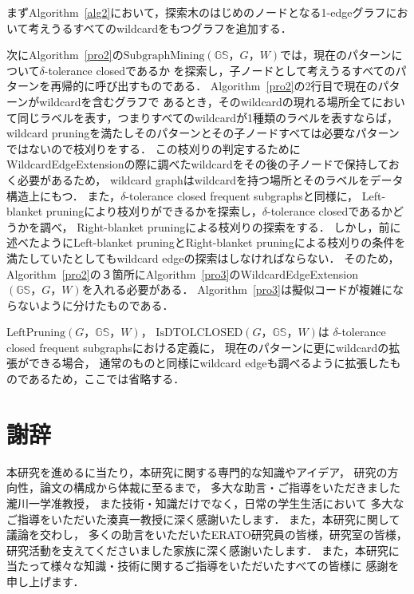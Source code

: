 \documentclass[12pt,fleqn]{jsotsuron}
\begin{document}
\begin{algorithm}
まずAlgorithm~\ref{alg2}において，探索木のはじめのノードとなる1-edgeグラフにおいて考えうるすべてのwildcardをもつグラフを追加する．

次にAlgorithm~\ref{pro2}の$\mathrm{SubgraphMining}(\mathbb{GS}，G，W)$では，現在のパターンについて$\delta$-tolerance closedであるか
を探索し，子ノードとして考えうるすべてのパターンを再帰的に呼び出すものである．
Algorithm~\ref{pro2}の2行目で現在のパターンがwildcardを含むグラフで
あるとき，そのwildcardの現れる場所全てにおいて同じラベルを表す，つまりすべてのwildcardが1種類のラベルを表すならば，
wildcard pruningを満たしそのパターンとその子ノードすべては必要なパターンではないので枝刈りをする．
この枝刈りの判定するために
WildcardEdgeExtensionの際に調べたwildcardをその後の子ノードで保持しておく必要があるため，
wildcard graphはwildcardを持つ場所とそのラベルをデータ構造上にもつ．
また，$\delta$-tolerance closed frequent subgraphsと同様に，
Left-blanket pruningにより枝刈りができるかを探索し，$\delta$-tolerance closedであるかどうかを調べ，
Right-blanket pruningによる枝刈りの探索をする．
しかし，前に述べたようにLeft-blanket pruningとRight-blanket pruningによる枝刈りの条件を満たしていたとしてもwildcard edgeの探索はしなければならない．
そのため，Algorithm~\ref{pro2}の３箇所にAlgorithm~\ref{pro3}のWildcardEdgeExtension$(\mathbb{GS}，G，W)$を入れる必要がある．
Algorithm~\ref{pro3}は擬似コードが複雑にならないように分けたものである．

$\mathrm{LeftPruning}(G，\mathbb{GS}，W)$，
$\mathrm{IsDTOLCLOSED}(G，\mathbb{GS}，W)$は
$\delta$-tolerance closed frequent subgraphsにおける定義\cite{deltol}に，
現在のパターンに更にwildcardの拡張ができる場合，
通常のものと同様にwildcard edgeも調べるように拡張したものであるため，ここでは省略する．


\newpage

\newpage



\chapter*{謝辞}

本研究を進めるに当たり，本研究に関する専門的な知識やアイデア，
研究の方向性，論文の構成から体裁に至るまで，
多大な助言・ご指導をいただきました瀧川一学准教授，
また技術・知識だけでなく，日常の学生生活において
多大なご指導をいただいた湊真一教授に深く感謝いたします．
また，本研究に関して議論を交わし，
多くの助言をいただいたERATO研究員の皆様，研究室の皆様，
研究活動を支えてくださいました家族に深く感謝いたします．
また，本研究に当たって様々な知識・技術に関するご指導をいただいたすべての皆様に
感謝を申し上げます．


\end{algorithm}
\end{document}
